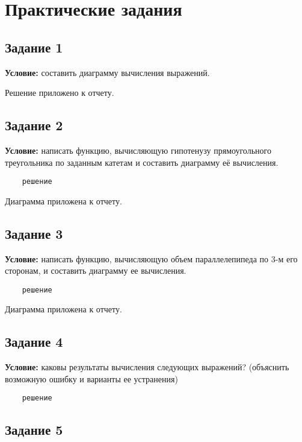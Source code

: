 \chapter{Практические задания}

\section{Задание 1}

\textbf{Условие:} составить диаграмму вычисления выражений.

Решение приложено к отчету.


\section{Задание 2}

\textbf{Условие:} написать функцию, вычисляющую гипотенузу прямоугольного треугольника по заданным катетам и составить диаграмму её вычисления.

\begin{lstlisting}
	решение
\end{lstlisting}

Диаграмма приложена к отчету.


\section{Задание 3}

\textbf{Условие:} написать функцию, вычисляющую объем параллелепипеда по 3-м его сторонам, и составить диаграмму ее вычисления.

\begin{lstlisting}
	решение
\end{lstlisting}

Диаграмма приложена к отчету.


\section{Задание 4}

\textbf{Условие:} каковы результаты вычисления следующих выражений? (объяснить возможную ошибку и варианты ее устранения)

\begin{lstlisting}
	решение
\end{lstlisting}


\section{Задание 5}

